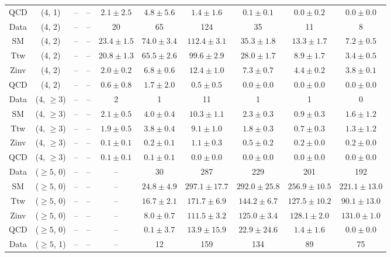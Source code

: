 \begin{table}[h!]
{\begin{tabular}{cccccccccc}
	QCD & (4, 1) & -- & -- & $2.1\pm 2.5$ & $4.8\pm 5.6$ & $1.4\pm 1.6$ & $0.1\pm 0.1$ & $0.0\pm 0.2$ & $0.0\pm 0.0$ \\[0.5ex] 
	Data & (4, 2) & -- & -- & 20 & 65 & 124 & 35 & 11 & 8 \\[0.5ex] 
	SM & (4, 2) & -- & -- & $23.4\pm 1.5$ & $74.0\pm 3.4$ & $112.4\pm 3.1$ & $35.3\pm 1.8$ & $13.3\pm 1.7$ & $7.2\pm 0.5$ \\[0.5ex] 
	Ttw & (4, 2) & -- & -- & $20.8\pm 1.3$ & $65.5\pm 2.6$ & $99.6\pm 2.9$ & $28.0\pm 1.7$ & $8.9\pm 1.7$ & $3.4\pm 0.5$ \\[0.5ex] 
	Zinv & (4, 2) & -- & -- & $2.0\pm 0.2$ & $6.8\pm 0.6$ & $12.4\pm 1.0$ & $7.3\pm 0.7$ & $4.4\pm 0.2$ & $3.8\pm 0.1$ \\[0.5ex] 
	QCD & (4, 2) & -- & -- & $0.6\pm 0.8$ & $1.7\pm 2.0$ & $0.5\pm 0.5$ & $0.0\pm 0.0$ & $0.0\pm 0.0$ & $0.0\pm 0.0$ \\[0.5ex] 
	Data & (4, $\ge3$) & -- & -- & 2 & 1 & 11 & 1 & 1 & 0 \\[0.5ex] 
	SM & (4, $\ge3$) & -- & -- & $2.1\pm 0.5$ & $4.0\pm 0.4$ & $10.3\pm 1.1$ & $2.3\pm 0.3$ & $0.9\pm 0.3$ & $1.6\pm 1.2$ \\[0.5ex] 
	Ttw & (4, $\ge3$) & -- & -- & $1.9\pm 0.5$ & $3.8\pm 0.4$ & $9.1\pm 1.0$ & $1.8\pm 0.3$ & $0.7\pm 0.3$ & $1.3\pm 1.2$ \\[0.5ex] 
	Zinv & (4, $\ge3$) & -- & -- & $0.1\pm 0.1$ & $0.2\pm 0.1$ & $1.1\pm 0.3$ & $0.5\pm 0.2$ & $0.2\pm 0.0$ & $0.2\pm 0.0$ \\[0.5ex] 
	QCD & (4, $\ge3$) & -- & -- & $0.1\pm 0.1$ & $0.1\pm 0.1$ & $0.0\pm 0.0$ & $0.0\pm 0.0$ & $0.0\pm 0.0$ & $0.0\pm 0.0$ \\[0.5ex] 
	Data & ($\ge5$, 0) & -- & -- & -- & 30 & 287 & 229 & 201 & 192 \\[0.5ex] 
	SM & ($\ge5$, 0) & -- & -- & -- & $24.8\pm 4.9$ & $297.1\pm 17.7$ & $292.0\pm 25.8$ & $256.9\pm 10.5$ & $221.1\pm 13.0$ \\[0.5ex] 
	Ttw & ($\ge5$, 0) & -- & -- & -- & $16.7\pm 2.1$ & $171.7\pm 6.9$ & $144.2\pm 6.7$ & $127.5\pm 10.2$ & $90.1\pm 13.0$ \\[0.5ex] 
	Zinv & ($\ge5$, 0) & -- & -- & -- & $8.0\pm 0.7$ & $111.5\pm 3.2$ & $125.0\pm 3.4$ & $128.1\pm 2.0$ & $131.0\pm 1.0$ \\[0.5ex] 
	QCD & ($\ge5$, 0) & -- & -- & -- & $0.1\pm 3.7$ & $13.9\pm 15.9$ & $22.9\pm 24.6$ & $1.4\pm 1.6$ & $0.0\pm 0.0$ \\[0.5ex] 
	Data & ($\ge5$, 1) & -- & -- & -- & 12 & 159 & 134 & 89 & 75 \\[0.5ex] 

\end{tabular}}
\end{table}
